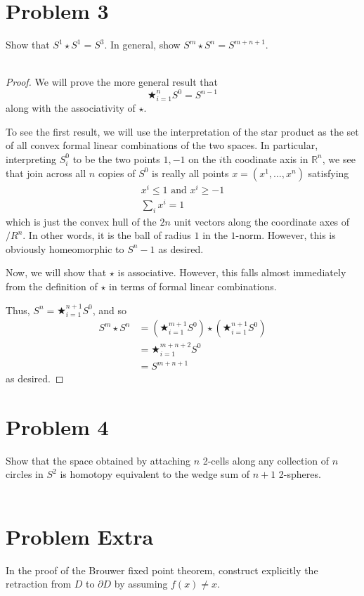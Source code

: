 \documentclass[fontsize=11pt]{scrartcl} %
\numberwithin{equation}{section} %
\numberwithin{figure}{section} %
\numberwithin{table}{section} %
\newcommand{\R}{\mathbb{R}}
\begin{document}
\section*{Problem 3}
Show that $S^1\star S^1=S^3$. In general, show $S^m\star S^n= S^{m+n+1}$.
\\
\\
\begin{proof}
    We will prove the more general result that
    \[
        \bigstar_{i=1}^n S^0 = S^{n-1}
    \]
    along with the associativity of $\star$.

    To see the first result, we will use the interpretation of the star product
    as the set of all convex formal linear combinations of the two spaces. In
    particular, interpreting $S^0_i$ to be the two points $1,-1$ on the $i$th
    coodinate axis in $\R^n$, we see that join across all $n$ copies of $S^0$ is
    really all points $x=(x^1,\ldots,x^n)$ satisfying
    \[
        \begin{aligned}
            x^i\leq 1 \textrm{ and } x^i\geq -1\\
            \sum_i x^i = 1
        \end{aligned}
    \]
    which is just the convex hull of the $2n$ unit vectors along the coordinate
    axes of $/R^n$. In other words, it is the ball of radius $1$ in the
    $1$-norm. However, this is obviously homeomorphic to $S^n-1$ as desired.

    Now, we will show that $\star$ is associative. However, this falls almost
    immediately from the definition of $\star$ in terms of formal linear
    combinations.

    Thus, $S^n = \bigstar_{i=1}^{n+1}S^0$, and so
    \[
        \begin{aligned}
            S^m\star S^n &=
            (\bigstar_{i=1}^{m+1}S^0)\star(\bigstar_{i=1}^{n+1}S^0)\\
            &=\bigstar_{i=1}^{m+n+2}S^0\\
            &= S^{m+n+1}
        \end{aligned}
    \]
    as desired.
\end{proof}

\section*{Problem 4}
Show that the space obtained by attaching $n$ 2-cells along any collection of
$n$ circles in $S^2$ is homotopy equivalent to the wedge sum of $n+1$ 2-spheres.
\\
\\



\section*{Problem Extra}
In the proof of the Brouwer fixed point theorem, construct explicitly the
retraction from $D$ to $\partial D$ by assuming $f(x)\neq x$.
\end{document}
